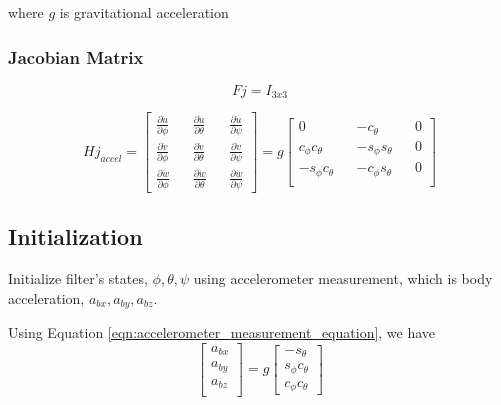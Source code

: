 \documentclass[]{article}
\begin{document}
where $g$ is gravitational acceleration

\subsubsection{Jacobian Matrix}

\begin{equation}
Fj = I_{3x3}
\end{equation}

\begin{equation}
Hj_{accel} = 
\begin{bmatrix}
\frac{\partial \dot{u}}{\partial \phi} && \frac{\partial \dot{u}}{\partial \theta} && \frac{\partial \dot{u}}{\partial \psi} \\
\frac{\partial \dot{v}}{\partial \phi} && \frac{\partial \dot{v}}{\partial \theta} && \frac{\partial \dot{v}}{\partial \psi} \\
\frac{\partial \dot{w}}{\partial \phi} && \frac{\partial \dot{w}}{\partial \theta} && \frac{\partial \dot{w}}{\partial \psi}
\end{bmatrix} = g
\begin{bmatrix}
0 && -c_{\theta} && 0 \\
c_{\phi}c_{\theta} && -s_{\phi}s_{\theta} && 0 \\
-s_{\phi}c_{\theta} && -c_{\phi}s_{\theta} && 0 \\
\end{bmatrix}
\end{equation}

\subsection{Initialization}
Initialize filter's states, $\phi, \theta, \psi$ using accelerometer measurement, which is body acceleration, $a_{bx}, a_{by}, a_{bz}$.

Using Equation \ref{eqn:accelerometer_measurement_equation}, we have 
\begin{equation}
\begin{bmatrix}
a_{bx} \\
a_{by} \\
a_{bz} \\
\end{bmatrix} = g
\begin{bmatrix}
-s_\theta \\
s_\phi c_\theta \\
c_\phi c_\theta
\end{bmatrix}
\end{equation}
\end{document}
